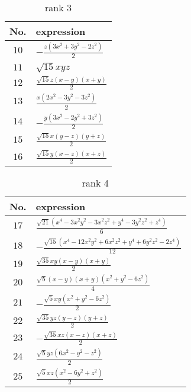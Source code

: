 \documentclass[fleqn,8pt,landscape]{jsarticle}
\begin{document}
\begin{table}[ht!]
\begin{center}
\caption{rank 3}
\renewcommand{\arraystretch}{1.3}
\begin{tabular}{cl} \hline \hline
No. & expression \\ \hline
$ 10 $ & $ - \frac{z \left(3 x^{2} + 3 y^{2} - 2 z^{2}\right)}{2} $ \\
$ 11 $ & $ \sqrt{15} x y z $ \\
$ 12 $ & $ \frac{\sqrt{15} z \left(x - y\right) \left(x + y\right)}{2} $ \\
$ 13 $ & $ \frac{x \left(2 x^{2} - 3 y^{2} - 3 z^{2}\right)}{2} $ \\
$ 14 $ & $ - \frac{y \left(3 x^{2} - 2 y^{2} + 3 z^{2}\right)}{2} $ \\
$ 15 $ & $ \frac{\sqrt{15} x \left(y - z\right) \left(y + z\right)}{2} $ \\
$ 16 $ & $ \frac{\sqrt{15} y \left(x - z\right) \left(x + z\right)}{2} $ \\
 \hline \hline
\end{tabular}
\end{center}
\end{table}
\begin{table}[ht!]
\begin{center}
\caption{rank 4}
\renewcommand{\arraystretch}{1.3}
\begin{tabular}{cl} \hline \hline
No. & expression \\ \hline
$ 17 $ & $ \frac{\sqrt{21} \left(x^{4} - 3 x^{2} y^{2} - 3 x^{2} z^{2} + y^{4} - 3 y^{2} z^{2} + z^{4}\right)}{6} $ \\
$ 18 $ & $ - \frac{\sqrt{15} \left(x^{4} - 12 x^{2} y^{2} + 6 x^{2} z^{2} + y^{4} + 6 y^{2} z^{2} - 2 z^{4}\right)}{12} $ \\
$ 19 $ & $ \frac{\sqrt{35} x y \left(x - y\right) \left(x + y\right)}{2} $ \\
$ 20 $ & $ \frac{\sqrt{5} \left(x - y\right) \left(x + y\right) \left(x^{2} + y^{2} - 6 z^{2}\right)}{4} $ \\
$ 21 $ & $ - \frac{\sqrt{5} x y \left(x^{2} + y^{2} - 6 z^{2}\right)}{2} $ \\
$ 22 $ & $ \frac{\sqrt{35} y z \left(y - z\right) \left(y + z\right)}{2} $ \\
$ 23 $ & $ - \frac{\sqrt{35} x z \left(x - z\right) \left(x + z\right)}{2} $ \\
$ 24 $ & $ \frac{\sqrt{5} y z \left(6 x^{2} - y^{2} - z^{2}\right)}{2} $ \\
$ 25 $ & $ \frac{\sqrt{5} x z \left(x^{2} - 6 y^{2} + z^{2}\right)}{2} $ \\
 \hline \hline
\end{tabular}
\end{center}
\end{table}
\end{document}
